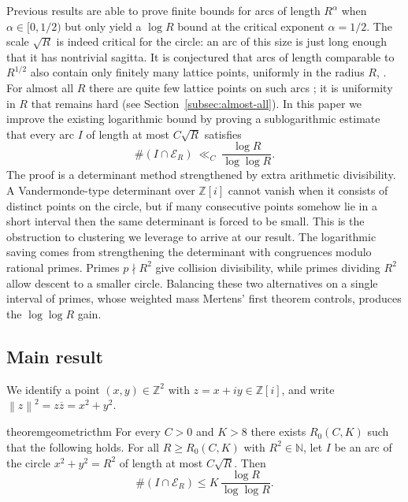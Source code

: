 \documentclass[11pt]{article}
\newcommand{\Z}{\mathbb Z}
\newcommand{\N}{\mathbb N}
\newcommand{\GI}{\mathbb Z[i]}
\newcommand{\Norm}[1]{\left\lVert#1\right\rVert^2}
\newcommand{\conj}[1]{\overline{#1}}
\newcommand{\E}{\mathcal E}
\begin{document}
Previous results are able to prove finite bounds for arcs of length $R^{\alpha}$ when $\alpha \in [0,1/2)$ but only yield a $\log R$ bound at the critical exponent $\alpha=1/2$.
The scale \(\sqrt R\) is indeed critical for the circle: an arc of this size is just long enough that it has nontrivial sagitta.
It is conjectured that arcs of length comparable to \(R^{1/2}\) also contain only finitely many lattice points, uniformly in the radius \(R\), \cite{CillerueloGranville2007,CillerueloGranville2009}.
For almost all \(R\) there are quite few lattice points on such arcs \cite{BourgainRudnick2011}; it is uniformity in \(R\) that remains hard (see Section~\ref{subsec:almost-all}).
In this paper we improve the existing logarithmic bound by proving a sublogarithmic estimate that every arc \(I\) of length at most \(C\sqrt R\) satisfies
\[
  \#(I\cap\E_R)\ \ll_C\ \frac{\log R}{\log\log R}.
\]
The proof is a determinant method strengthened by extra arithmetic divisibility.
A Vandermonde-type determinant over \(\Z[i]\) cannot vanish when it consists of distinct points on the circle, but if many consecutive points somehow lie in a short interval then the same determinant is forced to be small.
This is the obstruction to clustering we leverage to arrive at our result.
The logarithmic saving comes from strengthening the determinant with congruences modulo rational primes.
Primes \(p \nmid R^2\) give collision divisibility, while primes dividing \(R^2\) allow descent to a smaller circle.
Balancing these two alternatives on a single interval of primes, whose weighted mass Mertens' first theorem controls, produces the \(\log\log R\) gain.

\subsection{Main result}
\label{subsec:main-result}

We identify a point \((x,y)\in\Z^2\) with \(z=x+iy\in\GI\), and write \(\Norm{z}=z\conj z=x^2+y^2\).

\begin{restatable}{theorem}{geometricthm}\label{thm:geometric}
For every \(C>0\) and \(K>8\) there exists \(R_0(C,K)\) such that the following holds.
For all \(R\ge R_0(C,K)\) with \(R^2\in\N\), let \(I\) be an arc of the circle \(x^2+y^2=R^2\) of length at most \(C\sqrt R\).
Then
\[
  \#(I\cap\E_R)
  \le
  K\,\frac{\log R}{\log\log R}.
\]
\end{restatable}

\end{document}
